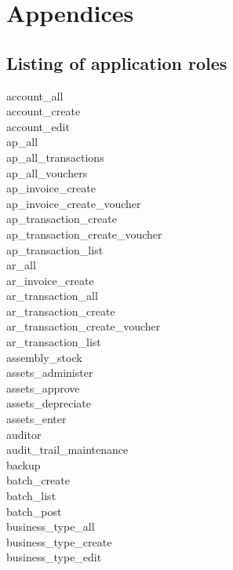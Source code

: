 


\part{Appendices}
\appendix

\chapter{Listing of application roles}

\begin{description}
\item[account\_all]
\item [account\_create]
\item [account\_edit]
\item [ap\_all]
\item [ap\_all\_transactions]
\item [ap\_all\_vouchers]
\item [ap\_invoice\_create]
\item [ap\_invoice\_create\_voucher]
\item [ap\_transaction\_create]
\item [ap\_transaction\_create\_voucher]
\item [ap\_transaction\_list]
\item [ar\_all]
\item [ar\_invoice\_create]
\item [ar\_transaction\_all]
\item [ar\_transaction\_create]
\item [ar\_transaction\_create\_voucher]
\item [ar\_transaction\_list]
\item [assembly\_stock]
\item [assets\_administer]
\item [assets\_approve]
\item [assets\_depreciate]
\item [assets\_enter]
\item [auditor]
\item [audit\_trail\_maintenance]
\item [backup]
\item [batch\_create]
\item [batch\_list]
\item [batch\_post]
\item [business\_type\_all]
\item [business\_type\_create]
\item [business\_type\_edit]

\end{description}
